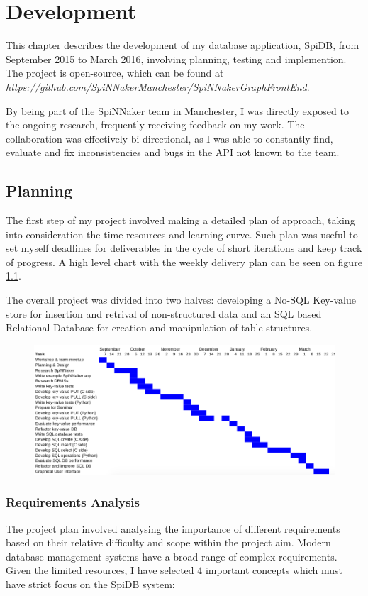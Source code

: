 \chapter{Development}

This chapter describes the development of my database application, SpiDB, from September 2015 to March 2016, involving planning, testing and implemention. The project is open-source, which can be found at
\textit{https://github.com/SpiNNakerManchester/SpiNNakerGraphFrontEnd}.

By being part of the SpiNNaker team in Manchester, I was directly exposed to the ongoing research, frequently receiving feedback on my work. The collaboration was effectively bi-directional, as I was able to constantly find, evaluate and fix inconsistencies and bugs in the API not known to the team.

\section{Planning}
The first step of my project involved making a detailed plan of approach, taking into consideration the time resources and learning curve. Such plan was useful to set myself deadlines for deliverables in the cycle of short iterations and keep track of progress. A high level chart with the weekly delivery plan can be seen on figure \ref{fig:plan}.

The overall project was divided into two halves: developing a No-SQL Key-value store for insertion and retrival of non-structured data and an SQL based Relational Database for creation and manipulation of table structures. 

\begin{figure}
\center
  \includegraphics[width=1.3\linewidth, natwidth=950, natheight=410]{images/plan.png}
  \label{fig:plan}
\end{figure}

\subsection{Requirements Analysis}
The project plan involved analysing the importance of different requirements based on their relative difficulty and scope within the project aim. Modern database management systems have a broad range of complex requirements. Given the limited resources, I have selected 4 important concepts which must have strict focus on the SpiDB system:

